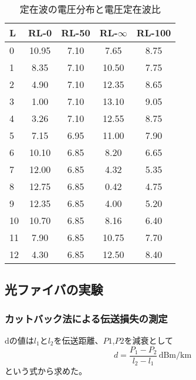 \documentclass[a4paper,11pt,xelatex,ja=standard]{bxjsarticle}
\begin{document}
            \begin{center}
                \begin{table}[H]
                    \caption{定在波の電圧分布と電圧定在波比}
                    \centering
                    \begin{tabular}{lcccc}
                        L & RL-0 & RL-50 & RL-\(\infty\) & RL-100 \\
                        \hline
                        0 & 10.95 & 7.10 & 7.65 & 8.75 \\
                        1 & 8.35 & 7.10 & 10.50 & 7.75 \\
                        2 & 4.90 & 7.10 & 12.35 & 8.65 \\
                        3 & 1.00 & 7.10 & 13.10 & 9.05 \\
                        4 & 3.26 & 7.10 & 12.55 & 8.75 \\
                        5 & 7.15 & 6.95 & 11.00 & 7.90 \\
                        6 & 10.10 & 6.85 & 8.20 & 6.65 \\
                        7 & 12.00 & 6.85 & 4.32 & 5.35 \\
                        8 & 12.75 & 6.85 & 0.42 & 4.75 \\
                        9 & 12.35 & 6.85 & 4.00 & 5.20 \\
                        10 & 10.70 & 6.85 & 8.16 & 6.40 \\
                        11 & 7.90 & 6.85 & 10.75 & 7.70 \\
                        12 & 4.30 & 6.85 & 12.50 & 8.40 \\
                    \end{tabular}
                \end{table}
            \end{center}
            
        
    \subsection{光ファイバの実験}
        \subsubsection{カットバック法による伝送損失の測定}

            dの値は$l_1$と$l_2$を伝送距離、$P1$,$P2$を減衰として
            \[
            d = \frac{P_1 - P_2}{l_2 - l_1} \, \text{dBm/km}
            \]
            という式から求めた。
\end{document}
